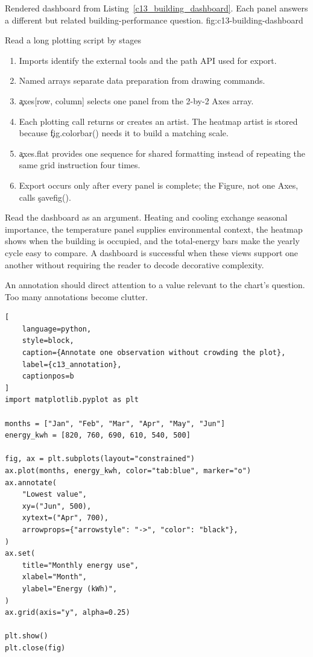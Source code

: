 {Rendered dashboard from Listing~\ref{c13_building_dashboard}. Each panel answers a different but related building-performance question.}
{fig:c13-building-dashboard}

\begin{SyntaxBox}{Read a long plotting script by stages}
\begin{enumerate}
    \item Imports identify the external tools and the path API used for export.
    \item Named arrays separate data preparation from drawing commands.
    \item \c{axes[row, column]} selects one panel from the 2-by-2 Axes array.
    \item Each plotting call returns or creates an artist. The heatmap artist is
          stored because \c{fig.colorbar()} needs it to build a matching scale.
    \item \c{axes.flat} provides one sequence for shared formatting instead of
          repeating the same grid instruction four times.
    \item Export occurs only after every panel is complete; the Figure, not one
          Axes, calls \c{savefig()}.
\end{enumerate}
\end{SyntaxBox}

Read the dashboard as an argument. Heating and cooling exchange seasonal
importance, the temperature panel supplies environmental context, the heatmap
shows when the building is occupied, and the total-energy bars make the yearly
cycle easy to compare. A dashboard is successful when these views support one
another without requiring the reader to decode decorative complexity.


An annotation should direct attention to a value relevant to the chart's
question. Too many annotations become clutter.

\begin{lstlisting}[
    language=python,
    style=block,
    caption={Annotate one observation without crowding the plot},
    label={c13_annotation},
    captionpos=b
]
import matplotlib.pyplot as plt

months = ["Jan", "Feb", "Mar", "Apr", "May", "Jun"]
energy_kwh = [820, 760, 690, 610, 540, 500]

fig, ax = plt.subplots(layout="constrained")
ax.plot(months, energy_kwh, color="tab:blue", marker="o")
ax.annotate(
    "Lowest value",
    xy=("Jun", 500),
    xytext=("Apr", 700),
    arrowprops={"arrowstyle": "->", "color": "black"},
)
ax.set(
    title="Monthly energy use",
    xlabel="Month",
    ylabel="Energy (kWh)",
)
ax.grid(axis="y", alpha=0.25)

plt.show()
plt.close(fig)
\end{lstlisting}

